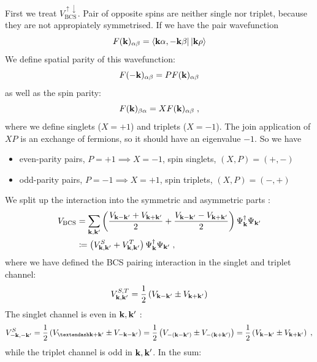 First we treat \(V_{\text{BCS}}^{\uparrow \downarrow}\).
Pair of opposite spins are neither single nor triplet, because they are not appropiately symmetrised.
If we have the pair wavefunction
\begin{equation}
    F(\mathbf{k})_{\alpha \beta} = \bra{\mathbf{k}\alpha, -\mathbf{k}\beta} \ket{\mathbf{k}\rho}
\end{equation}
We define spatial parity of this wavefunction:
\begin{equation}
    F(-\mathbf{k})_{\alpha \beta} = P F(\mathbf{k})_{\alpha \beta}
\end{equation}
as well as the spin parity:
\begin{equation}
    F(\mathbf{k})_{\beta \alpha} = X F(\mathbf{k})_{\alpha \beta}
    \;,
\end{equation}
where we define singlets (\(X=+1\)) and triplets (\(X=-1\)).
The join application of \(XP\) is an exchange of fermions, so it should have an eigenvalue \(-1\).
So we have
\begin{itemize}
    \item even-parity pairs, \(P=+1 \implies X=-1\), spin singlets, \((X, P) = (+, -)\)
    \item odd-parity pairs, \(P=-1 \implies X=+1\), spin triplets, \((X, P) = (-, +)\)
\end{itemize}
We split up the interaction into the symmetric and asymmetric parts 
:
\begin{align}
    V_{\text{BCS}} &= \sum_{\mathbf{k}, \mathbf{k}^{\prime}} \left(\frac{V_{\mathbf{k} - \mathbf{k}^{\prime}} + V_{\mathbf{k} + \mathbf{k}^{\prime}}}{2} + \frac{V_{\mathbf{k} - \mathbf{k}^{\prime}} - V_{\mathbf{k} + \mathbf{k}^{\prime}}}{2}\right) \Psi_{\mathbf{k}}^{\dagger} \Psi_{\mathbf{k}^{\prime}} \\
    &\coloneq \left( V_{\mathbf{k}, \mathbf{k}^{\prime}}^S + V_{\mathbf{k}, \mathbf{k}^{\prime}}^T \right) \Psi_{\mathbf{k}}^{\dagger} \Psi_{\mathbf{k}^{\prime}}
    \;,
\end{align}
where we have defined the BCS pairing interaction in the singlet and triplet channel:
\begin{equation}
    V_{\mathbf{k}, \mathbf{k}^{\prime}}^{S, T} = \frac{1}{2} \left( V_{\mathbf{k} - \mathbf{k}^{\prime}} \pm V_{\mathbf{k} + \mathbf{k}^{\prime}} \right)
\end{equation}
The singlet channel is even in \(\mathbf{k}, \mathbf{k}^{\prime}\) :
\begin{align}
    V_{-\vb{k}, -\vb{k}^{\prime}}^{S} = \frac{1}{2} \left( V_{–\vb{k} + \vb{k}^{\prime}} \pm V_{-\vb{k} - \vb{k}^{\prime}} \right)
    = \frac{1}{2} \left( V_{-(\vb{k} - \vb{k}^{\prime})} \pm V_{-(\vb{k} + \vb{k}^{\prime})} \right)
    = \frac{1}{2} \left( V_{\vb{k} - \vb{k}^{\prime}} \pm V_{\vb{k} + \vb{k}^{\prime}} \right)
    \;,
\end{align}
while the triplet channel is odd in \(\mathbf{k}, \mathbf{k}^{\prime}\).
In the sum:


